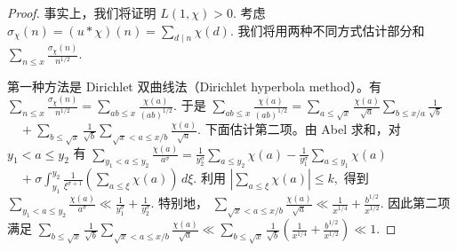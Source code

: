 \begin{proof}
	事实上，我们将证明
	\(\textstyle L(1,\allowbreak{}\chi)>0.\)
	考虑
	\(\textstyle \sigma_\chi(n)=\allowbreak{}(u*\chi)(n) =\allowbreak{} \sum_{d\mid\allowbreak{} n}\chi(d).\)
	我们将用两种不同方式估计部分和
	\(\textstyle \sum_{n\leq\allowbreak{} x}\frac{\sigma_\chi(n)}{n^{1/2}}.\)

	第一种方法是 Dirichlet 双曲线法（Dirichlet hyperbola method）。有
	\(\textstyle \sum_{n\leq\allowbreak{} x}\frac{\sigma_\chi(n)}{n^{1/2}} =\allowbreak{} \sum_{ab\leq\allowbreak{} x}\frac{\chi(a)}{(ab)^{1/2}}.\)
	于是
	\(\textstyle \sum_{ab\leq\allowbreak{} x}\frac{\chi(a)}{(ab)^{1/2}} =\allowbreak{} \sum_{a\leq\allowbreak{}\sqrt{x}}\frac{\chi(a)}{\sqrt{a}} \sum_{b\leq\allowbreak{} x/a}\frac{1}{\sqrt{b}}\) \(\textstyle \quad+\allowbreak{} \sum_{b\leq\allowbreak{}\sqrt{x}}\frac{1}{\sqrt{b}} \sum_{\sqrt{x}<a\leq\allowbreak{} x/b}\frac{\chi(a)}{\sqrt{a}}.\)
	下面估计第二项。由 Abel 求和，对 $y_1<a\leq y_2$ 有
	\(\textstyle \sum_{y_1<a\leq\allowbreak{} y_2}\frac{\chi(a)}{a^\sigma} =\allowbreak{} \frac{1}{y_2^\sigma}\sum_{a\leq\allowbreak{} y_2}\chi(a) - \frac{1}{y_1^\sigma}\sum_{a\leq\allowbreak{} y_1}\chi(a)\) \(\textstyle \quad+\allowbreak{} \sigma\int_{y_1}^{y_2} \frac{1}{\xi^{\sigma+\allowbreak{}1}} \left(\sum_{a\leq\allowbreak{} \xi}\chi(a)\right)\,d\xi.\)
	利用
	\(\textstyle \left|\sum_{a\leq\allowbreak{} \xi}\chi(a)\right|\leq\allowbreak{} k,\allowbreak{}\)
	得到
	\(\textstyle \sum_{y_1<a\leq\allowbreak{} y_2}\frac{\chi(a)}{a^\sigma} \ll\allowbreak{} \frac{1}{y_1^\sigma}+\allowbreak{}\frac{1}{y_2^\sigma}.\)
	特别地，
	\(\textstyle \sum_{\sqrt{x}<a\leq\allowbreak{} x/b}\frac{\chi(a)}{\sqrt{a}} \ll\allowbreak{} \frac{1}{x^{1/4}}+\allowbreak{}\frac{b^{1/2}}{x^{1/2}}.\)
	因此第二项满足
	\(\textstyle \sum_{b\leq\allowbreak{}\sqrt{x}}\frac{1}{\sqrt{b}} \sum_{\sqrt{x}<a\leq\allowbreak{} x/b}\frac{\chi(a)}{\sqrt{a}} \ll\allowbreak{} \sum_{b\leq\allowbreak{}\sqrt{x}}\frac{1}{\sqrt{b}} \left(\frac{1}{x^{1/4}}+\allowbreak{}\frac{b^{1/2}}{x^{1/2}}\right) \ll\allowbreak{} 1.\)


\end{proof}
